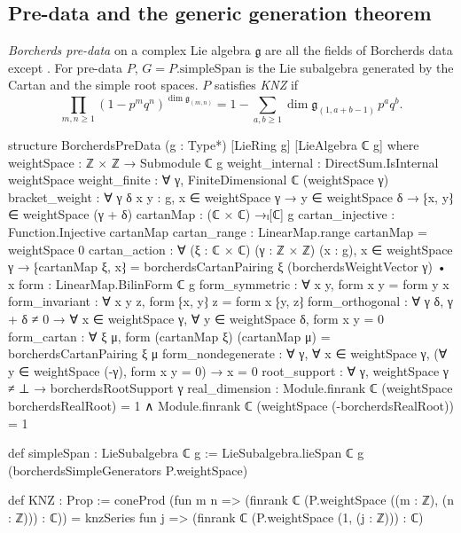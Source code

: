 \subsection{Pre-data and the generic generation theorem}

\begin{definition}\label{ch20:def:predata}
\emph{Borcherds pre-data} on a complex Lie algebra $\mathfrak g$ are all the fields of Borcherds data except
.  For pre-data $P$, $G=P.\mathrm{simpleSpan}$ is the Lie subalgebra generated by the Cartan and the simple
root spaces.  $P$ satisfies \emph{KNZ} if
\begin{equation*}
  \prod_{m,n\ge1}(1-p^mq^n)^{\dim\mathfrak g_{(m,n)}}=1-\sum_{a,b\ge1}\dim\mathfrak g_{(1,a+b-1)}\,p^aq^b .
\end{equation*}
\end{definition}
\begin{leancode}
structure BorcherdsPreData (g : Type*) [LieRing g] [LieAlgebra ℂ g] where
  weightSpace : ℤ × ℤ → Submodule ℂ g
  weight_internal : DirectSum.IsInternal weightSpace
  weight_finite : ∀ γ, FiniteDimensional ℂ (weightSpace γ)
  bracket_weight : ∀ {γ δ} {x y : g},
    x ∈ weightSpace γ → y ∈ weightSpace δ → ⁅x, y⁆ ∈ weightSpace (γ + δ)
  cartanMap : (ℂ × ℂ) →ₗ[ℂ] g
  cartan_injective : Function.Injective cartanMap
  cartan_range : LinearMap.range cartanMap = weightSpace 0
  cartan_action : ∀ (ξ : ℂ × ℂ) (γ : ℤ × ℤ) (x : g), x ∈ weightSpace γ →
    ⁅cartanMap ξ, x⁆ = borcherdsCartanPairing ξ (borcherdsWeightVector γ) • x
  form : LinearMap.BilinForm ℂ g
  form_symmetric : ∀ x y, form x y = form y x
  form_invariant : ∀ x y z, form ⁅x, y⁆ z = form x ⁅y, z⁆
  form_orthogonal : ∀ γ δ, γ + δ ≠ 0 → ∀ x ∈ weightSpace γ,
    ∀ y ∈ weightSpace δ, form x y = 0
  form_cartan : ∀ ξ μ, form (cartanMap ξ) (cartanMap μ) = borcherdsCartanPairing ξ μ
  form_nondegenerate : ∀ γ, ∀ x ∈ weightSpace γ,
    (∀ y ∈ weightSpace (-γ), form x y = 0) → x = 0
  root_support : ∀ γ, weightSpace γ ≠ ⊥ → borcherdsRootSupport γ
  real_dimension : Module.finrank ℂ (weightSpace borcherdsRealRoot) = 1 ∧
    Module.finrank ℂ (weightSpace (-borcherdsRealRoot)) = 1

def simpleSpan : LieSubalgebra ℂ g :=
  LieSubalgebra.lieSpan ℂ g (borcherdsSimpleGenerators P.weightSpace)

def KNZ : Prop :=
  coneProd (fun m n => (finrank ℂ (P.weightSpace ((m : ℤ), (n : ℤ))) : ℂ)) =
    knzSeries fun j => (finrank ℂ (P.weightSpace (1, (j : ℤ))) : ℂ)
\end{leancode}
